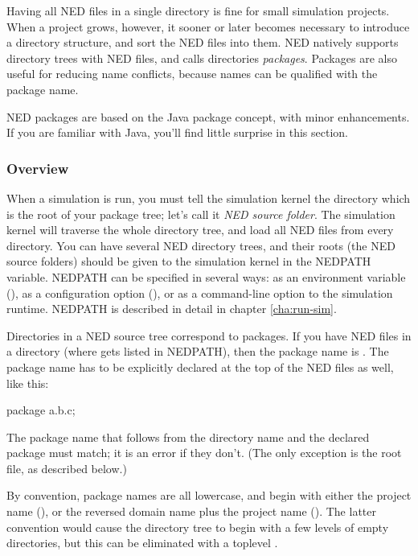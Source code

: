 Having all NED files in a single directory is fine for small simulation projects.
When a project grows, however, it sooner or later becomes
necessary to introduce a directory structure, and sort the NED files into
them. NED natively supports directory trees with NED files, and calls
directories \textit{packages}. Packages are also useful for reducing
name conflicts, because names can be qualified with the package name.

\begin{note}
    NED packages are based on the Java package concept, with minor
    enhancements. If you are familiar with Java, you'll find little
    surprise in this section.
\end{note}

\subsubsection{Overview}

When a simulation is run, you must tell the simulation kernel the
directory which is the root of your package tree; let's call it
\textit{NED source folder}. The simulation kernel will traverse
the whole directory tree, and load all NED files from every directory.
You can have several NED directory trees, and their roots (the NED source
folders) should be given to the simulation kernel in the NEDPATH
variable. NEDPATH can be specified in several ways: as an environment
variable (), as a configuration option (),
or as a command-line option to the simulation runtime. NEDPATH is
described in detail in chapter \ref{cha:run-sim}.

Directories in a NED source tree correspond to packages. If you have
NED files in a  directory (where 
gets listed in NEDPATH), then the package name is .
The package name has to be explicitly declared at the top of the NED
files as well, like this:

\begin{ned}
package a.b.c;
\end{ned}

The package name that follows from the directory name and the declared
package must match; it is an error if they don't. (The only exception
is the root  file, as described below.)

By convention, package names are all lowercase, and begin with either
the project name (), or the reversed domain name plus the
project name (). The latter convention
would cause the directory tree to begin with a few levels of empty
directories, but this can be eliminated with a toplevel .


